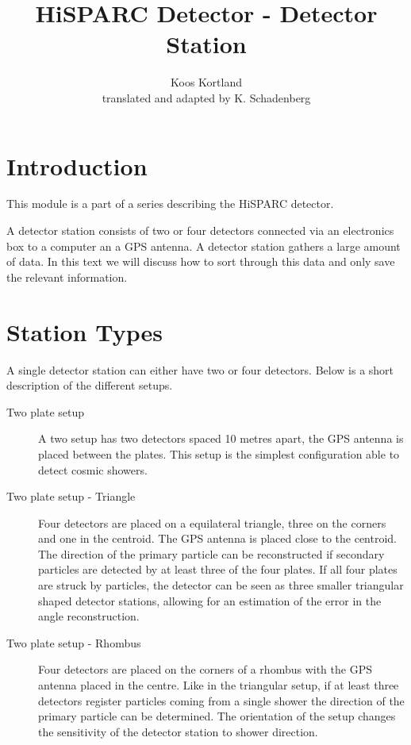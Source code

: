 


\author{Koos Kortland \\ translated and adapted by K. Schadenberg}
\date{}
\title{HiSPARC Detector - Detector Station}



\maketitle

\section{Introduction}
This module is a part of a series describing the HiSPARC detector.

A detector station consists of two or four detectors connected via an electronics box to a computer an a GPS antenna. A detector station gathers a large amount of data. In this text we will discuss how to sort through this data and only save the relevant information.

\section{Station Types}
A single detector station can either have two or four detectors. Below is a short description of the different setups.
\begin{description}
\item [Two plate setup] A two setup has two detectors spaced 10 metres apart, the GPS antenna is placed between the plates. This setup is the simplest configuration able to detect cosmic showers.
\item [Two plate setup - Triangle] Four detectors are placed on a equilateral triangle, three on the corners and one in the centroid. The GPS antenna is placed close to the centroid. The direction of the primary particle can be reconstructed if secondary particles are detected by at least three of the four plates.  If all four plates are struck by particles, the detector can be seen as three smaller triangular shaped detector stations, allowing for an estimation of the error in the angle reconstruction.
\item [Two plate setup - Rhombus] Four detectors are placed on the corners of a rhombus with the GPS antenna placed in the centre. Like in the triangular setup, if at least three detectors register particles coming from a single shower the direction of the primary particle can be determined. The orientation of the setup changes the sensitivity of the detector station to shower direction.
\end{description}

